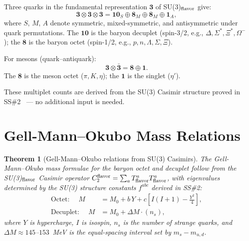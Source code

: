 \documentclass[11pt,a4paper]{article}
\newtheorem{theorem}{Theorem}[section]
\begin{document}
Three quarks in the fundamental representation $\mathbf{3}$ of
SU(3)$_{\rm flavor}$ give:
\begin{equation}
\mathbf{3} \otimes \mathbf{3} \otimes \mathbf{3}
= \mathbf{10}_S \oplus \mathbf{8}_M \oplus \mathbf{8}_M \oplus
  \mathbf{1}_A,
\label{eq:3x3x3}
\end{equation}
where $S$, $M$, $A$ denote symmetric, mixed-symmetric, and
antisymmetric under quark permutations.  The $\mathbf{10}$ is the
baryon decuplet (spin-3/2, e.g., $\Delta, \Sigma^*, \Xi^*, \Omega^-$);
the $\mathbf{8}$ is the baryon octet (spin-1/2, e.g.,
$p, n, \Lambda, \Sigma, \Xi$).

For mesons (quark--antiquark):
\begin{equation}
\mathbf{3} \otimes \bar{\mathbf{3}} = \mathbf{8} \oplus \mathbf{1}.
\label{eq:3x3bar}
\end{equation}
The $\mathbf{8}$ is the meson octet ($\pi, K, \eta$);
the $\mathbf{1}$ is the singlet ($\eta'$).

These multiplet counts are derived from the SU(3) Casimir structure
proved in SS\#2~\citep{cpp_ss2} --- no additional input is needed.

\section{Gell-Mann--Okubo Mass Relations}
\label{sec:gmo}

\begin{theorem}[Gell-Mann--Okubo relations from SU(3) Casimirs]
\label{thm:gmo}
The Gell-Mann--Okubo mass formulae for the baryon octet and
decuplet follow from the SU(3)$_{\rm flavor}$ Casimir operator
$C_2^{\rm flavor} = \sum_a T^a_{\rm flavor} T^a_{\rm flavor}$,
with eigenvalues determined by the SU(3) structure constants
$f^{abc}$ derived in SS\#2:
\begin{align}
\text{Octet: }\quad
M &= M_0 + b\,Y + c\left[I(I+1) - \tfrac{Y^2}{4}\right],
\label{eq:gmo_octet} \\
\text{Decuplet: }\quad
M &= M_0 + \Delta M \cdot (n_s),
\label{eq:gmo_decuplet}
\end{align}
where $Y$ is hypercharge, $I$ is isospin, $n_s$ is the number
of strange quarks, and $\Delta M \approx 145$--$153$~MeV is the
equal-spacing interval set by $m_s - m_{u,d}$.
\end{theorem}
\end{document}
